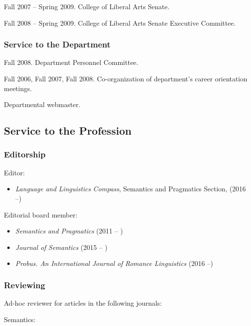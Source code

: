 \documentclass[11pt]{article}
\begin{document}
Fall 2007 -- Spring 2009. College of Liberal Arts Senate.

Fall 2008 -- Spring 2009. College of Liberal Arts Senate Executive Committee.

\subsubsection*{Service to the Department}

Fall 2008.  Department Personnel Committee.

Fall 2006, Fall 2007, Fall 2008. Co-organization of department's
career orientation meetings.

Departmental webmaster.

\subsection*{Service to the Profession}

\subsubsection*{Editorship}

Editor:

\begin{itemize}

\item[] \textit{Language and Linguistics Compass}, Semantics and Pragmatics Section, (2016 --)

\end{itemize}

Editorial board member: 

\begin{itemize}
  \item[] \textit{Semantics and Pragmatics} (2011 -- )
  \item[] \textit{Journal of Semantics} (2015 -- )
  \item[] \textit{Probus. An International Journal of Romance Linguistics} (2016 --)
\end{itemize}

\vspace{-10pt}

\subsubsection*{Reviewing}

Ad-hoc reviewer for articles in the following journals:

Semantics: 
\end{document}
